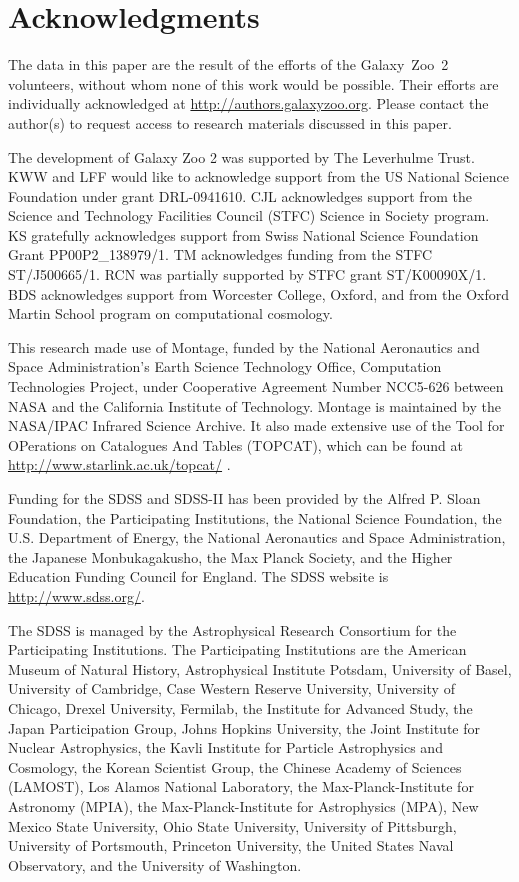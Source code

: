 \documentclass[useAMS,usenatbib]{mn2e}
\begin{document}

\section*{Acknowledgments}
The data in this paper are the result of the efforts of the Galaxy~Zoo~2 volunteers, without whom none of this work would be possible. Their efforts are individually acknowledged at \url{http://authors.galaxyzoo.org}. Please contact the author(s) to request access to research materials discussed in this paper. 

The development of Galaxy Zoo 2 was supported by The Leverhulme Trust. KWW and LFF would like to acknowledge support from the US National Science Foundation under grant DRL-0941610. CJL acknowledges support from the Science and Technology Facilities Council (STFC) Science in Society program. KS gratefully acknowledges support from Swiss National Science Foundation Grant PP00P2\_138979/1. TM acknowledges funding from the STFC ST/J500665/1. RCN was partially supported by STFC grant ST/K00090X/1. BDS acknowledges support from Worcester College, Oxford, and from the Oxford Martin School program on computational cosmology.

This research made use of Montage, funded by the National Aeronautics and Space Administration's Earth Science Technology Office, Computation Technologies Project, under Cooperative Agreement Number NCC5-626 between NASA and the California Institute of Technology. Montage is maintained by the NASA/IPAC Infrared Science Archive. It also made extensive use of the Tool for OPerations on Catalogues And Tables (TOPCAT), which can be found at \url{http://www.starlink.ac.uk/topcat/} \citep{tay05,tay11}. 

Funding for the SDSS and SDSS-II has been provided by the Alfred P. Sloan Foundation, the Participating Institutions, the National Science Foundation, the U.S. Department of Energy, the National Aeronautics and Space Administration, the Japanese Monbukagakusho, the Max Planck Society, and the Higher Education Funding Council for England. The SDSS website is \url{http://www.sdss.org/}.

The SDSS is managed by the Astrophysical Research Consortium for the Participating Institutions. The Participating Institutions are the American Museum of Natural History, Astrophysical Institute Potsdam, University of Basel, University of Cambridge, Case Western Reserve University, University of Chicago, Drexel University, Fermilab, the Institute for Advanced Study, the Japan Participation Group, Johns Hopkins University, the Joint Institute for Nuclear Astrophysics, the Kavli Institute for Particle Astrophysics and Cosmology, the Korean Scientist Group, the Chinese Academy of Sciences (LAMOST), Los Alamos National Laboratory, the Max-Planck-Institute for Astronomy (MPIA), the Max-Planck-Institute for Astrophysics (MPA), New Mexico State University, Ohio State University, University of Pittsburgh, University of Portsmouth, Princeton University, the United States Naval Observatory, and the University of Washington.
\end{document}
